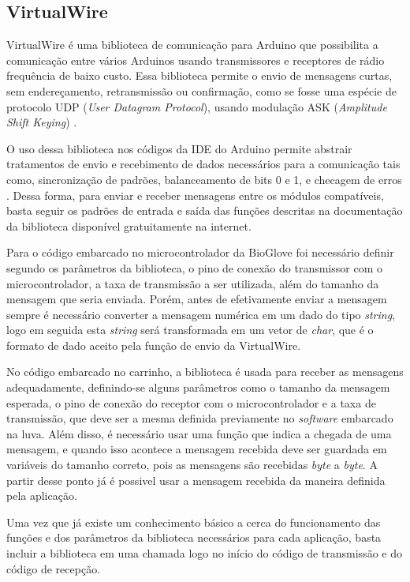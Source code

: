 \documentclass[
	12pt,				%
	openright,			%
	oneside,			%
	a4paper,			%
	english,			%
	brazil				%
	]{abntex2}
\begin{document}
		\subsection{VirtualWire}


		VirtualWire é uma biblioteca de comunicação para Arduino que possibilita a comunicação entre vários Arduinos usando transmissores e receptores de rádio frequência de baixo custo. Essa biblioteca permite o envio de mensagens curtas, sem endereçamento, retransmissão ou confirmação, como se fosse uma espécie de protocolo UDP (\textit{User Datagram Protocol}), usando modulação ASK (\textit{Amplitude Shift Keying}) \cite{virtualwiremanual}. 

		O uso dessa biblioteca nos códigos da IDE do Arduino permite abstrair tratamentos de envio e recebimento de dados necessários para a comunicação tais como, sincronização de padrões, balanceamento de bits 0 e 1, e checagem de erros \cite{virtualwirepjrc}. Dessa forma, para enviar e receber mensagens entre os módulos compatíveis, basta seguir os padrões de entrada e saída das funções descritas na documentação da biblioteca disponível gratuitamente na internet.

		Para o código embarcado no microcontrolador da BioGlove foi necessário definir segundo os parâmetros da biblioteca, o pino de conexão do transmissor com o microcontrolador, a taxa de transmissão a ser utilizada, além do tamanho da mensagem que seria enviada. Porém, antes de efetivamente enviar a mensagem sempre é necessário converter a mensagem numérica em um dado do tipo \textit{string}, logo em seguida esta \textit{string} será transformada em um vetor de \textit{char}, que é o formato de dado aceito pela função de envio da VirtualWire.

		No código embarcado no carrinho, a biblioteca é usada para receber as mensagens adequadamente, definindo-se alguns parâmetros como o tamanho da mensagem esperada, o pino de conexão do receptor com o microcontrolador e a taxa de transmissão, que deve ser a mesma definida previamente no \textit{software} embarcado na luva. Além disso, é necessário usar uma função que indica a chegada de uma mensagem, e quando isso acontece a mensagem recebida deve ser guardada em variáveis do tamanho correto, pois as mensagens são recebidas \textit{byte} a \textit{byte}. A partir desse ponto já é possivel usar a mensagem recebida da maneira definida pela aplicação.

		Uma vez que já existe um conhecimento básico a cerca do funcionamento das funções e dos parâmetros da biblioteca necessários para cada aplicação, basta incluir a biblioteca em uma chamada logo no início do código de transmissão e do código de recepção.
\end{document}
